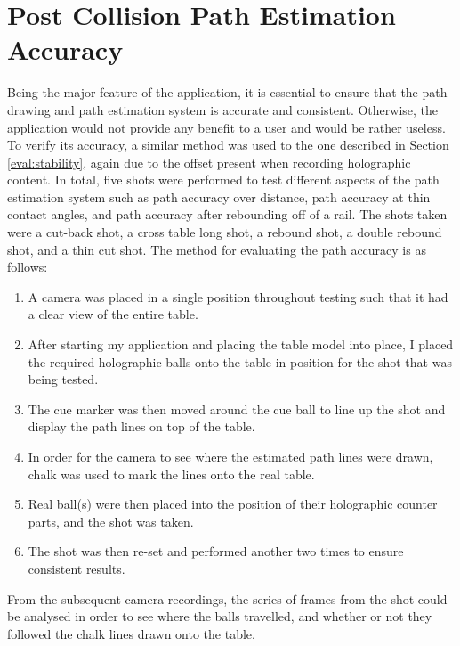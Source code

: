 \documentclass[ %
                author={Finn Alexander Wilkinson},
                supervisor={Dr. Andrew Calway},
                degree={MEng},
                title={\centering A Mixed Reality Aim Assistant for Pool and Snooker},
                subtitle={},
                type={Enterprise},
                year={2021} ]{dissertation}
\begin{document}
\section{Post Collision Path Estimation Accuracy}
\label{eval:pathAccuracy}
Being the major feature of the application, it is essential to ensure that the path drawing and path estimation system is accurate and consistent. Otherwise, the application would not provide any benefit to a user and would be rather useless. To verify its accuracy, a similar method was used to the one described in Section \ref{eval:stability}, again due to the offset present when recording holographic content. In total, five shots were performed to test different aspects of the path estimation system such as path accuracy over distance, path accuracy at thin contact angles, and path accuracy after rebounding off of a rail. The shots taken were a cut-back shot, a cross table long shot, a rebound shot, a double rebound shot, and a thin cut shot. The method for evaluating the path accuracy is as follows:
\begin{enumerate}
    \item A camera was placed in a single position throughout testing such that it had a clear view of the entire table.
    \item After starting my application and placing the table model into place, I placed the required holographic balls onto the table in position for the shot that was being tested.
    \item The cue marker was then moved around the cue ball to line up the shot and display the path lines on top of the table.
    \item In order for the camera to see where the estimated path lines were drawn, chalk was used to mark the lines onto the real table.
    \item Real ball(s) were then placed into the position of their holographic counter parts, and the shot was taken.
    \item The shot was then re-set and performed another two times to ensure consistent results.
\end{enumerate}

From the subsequent camera recordings, the series of frames from the shot could be analysed in order to see where the balls travelled, and whether or not they followed the chalk lines drawn onto the table.
 
\end{document}
